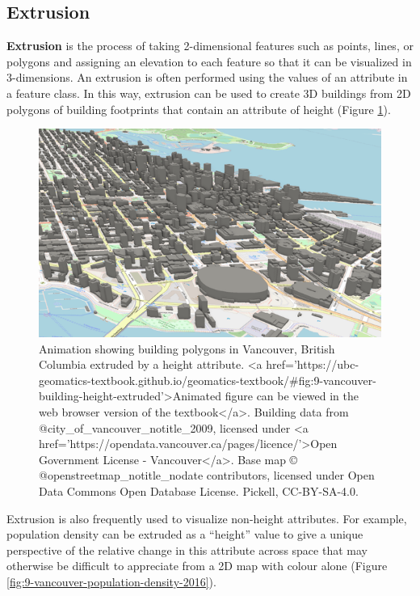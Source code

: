 \documentclass[
]{book}
\begin{document}
\subsection{Extrusion}\label{extrusion}

\textbf{Extrusion} is the process of taking 2-dimensional features such as points, lines, or polygons and assigning an elevation to each feature so that it can be visualized in 3-dimensions. An extrusion is often performed using the values of an attribute in a feature class. In this way, extrusion can be used to create 3D buildings from 2D polygons of building footprints that contain an attribute of height (Figure \ref{fig:9-vancouver-building-height-extruded}).

\begin{figure}
\includegraphics[width=0.75\linewidth]{images/09-vancouver-building-height-extruded} \caption{Animation showing building polygons in Vancouver, British Columbia extruded by a height attribute. <a href='https://ubc-geomatics-textbook.github.io/geomatics-textbook/#fig:9-vancouver-building-height-extruded'>Animated figure can be viewed in the web browser version of the textbook</a>. Building data from @city_of_vancouver_notitle_2009, licensed under <a href='https://opendata.vancouver.ca/pages/licence/'>Open Government License - Vancouver</a>. Base map © @openstreetmap_notitle_nodate contributors, licensed under Open Data Commons Open Database License. Pickell, CC-BY-SA-4.0.}\label{fig:9-vancouver-building-height-extruded}
\end{figure}

Extrusion is also frequently used to visualize non-height attributes. For example, population density can be extruded as a ``height'' value to give a unique perspective of the relative change in this attribute across space that may otherwise be difficult to appreciate from a 2D map with colour alone (Figure \ref{fig:9-vancouver-population-density-2016}).
\end{document}
